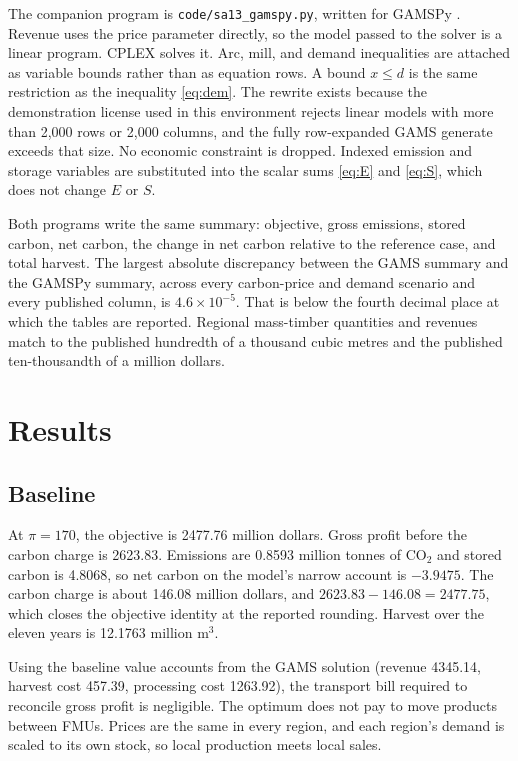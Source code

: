 \documentclass[11pt]{article}
\begin{document}
The companion program is \texttt{code/sa13\_gamspy.py}, written for GAMSPy \cite{gamspy}. Revenue uses the price parameter directly, so the model passed to the solver is a linear program. CPLEX solves it. Arc, mill, and demand inequalities are attached as variable bounds rather than as equation rows. A bound $x \le d$ is the same restriction as the inequality \eqref{eq:dem}. The rewrite exists because the demonstration license used in this environment rejects linear models with more than 2,000 rows or 2,000 columns, and the fully row-expanded GAMS generate exceeds that size. No economic constraint is dropped. Indexed emission and storage variables are substituted into the scalar sums \eqref{eq:E} and \eqref{eq:S}, which does not change $E$ or $S$.

Both programs write the same summary: objective, gross emissions, stored carbon, net carbon, the change in net carbon relative to the reference case, and total harvest. The largest absolute discrepancy between the GAMS summary and the GAMSPy summary, across every carbon-price and demand scenario and every published column, is $4.6 \times 10^{-5}$. That is below the fourth decimal place at which the tables are reported. Regional mass-timber quantities and revenues match to the published hundredth of a thousand cubic metres and the published ten-thousandth of a million dollars.

\section{Results}
\label{sec:results}

\subsection{Baseline}

At $\pi = 170$, the objective is 2477.76 million dollars. Gross profit before the carbon charge is 2623.83. Emissions are 0.8593 million tonnes of CO$_2$ and stored carbon is 4.8068, so net carbon on the model's narrow account is $-3.9475$. The carbon charge is about 146.08 million dollars, and $2623.83 - 146.08 = 2477.75$, which closes the objective identity at the reported rounding. Harvest over the eleven years is 12.1763 million m$^3$.

Using the baseline value accounts from the GAMS solution (revenue 4345.14, harvest cost 457.39, processing cost 1263.92), the transport bill required to reconcile gross profit is negligible. The optimum does not pay to move products between FMUs. Prices are the same in every region, and each region's demand is scaled to its own stock, so local production meets local sales.
\end{document}
